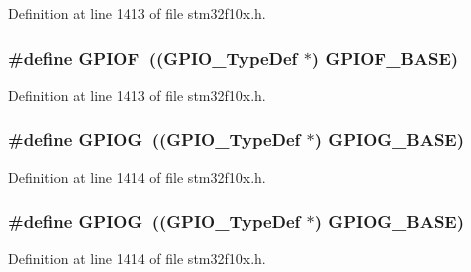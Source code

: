 Definition at line 1413 of file stm32f10x.\+h.

\subsubsection[{\texorpdfstring{G\+P\+I\+OF}{GPIOF}}]{\setlength{\rightskip}{0pt plus 5cm}\#define G\+P\+I\+OF~(({\bf G\+P\+I\+O\+\_\+\+Type\+Def} $\ast$) {\bf G\+P\+I\+O\+F\+\_\+\+B\+A\+SE})}\hypertarget{group___peripheral__declaration_ga43c3022dede7c9db7a58d3c3409dbc8d}{}\label{group___peripheral__declaration_ga43c3022dede7c9db7a58d3c3409dbc8d}


Definition at line 1413 of file stm32f10x.\+h.

\subsubsection[{\texorpdfstring{G\+P\+I\+OG}{GPIOG}}]{\setlength{\rightskip}{0pt plus 5cm}\#define G\+P\+I\+OG~(({\bf G\+P\+I\+O\+\_\+\+Type\+Def} $\ast$) {\bf G\+P\+I\+O\+G\+\_\+\+B\+A\+SE})}\hypertarget{group___peripheral__declaration_ga02a2a23a32f9b02166a8c64012842414}{}\label{group___peripheral__declaration_ga02a2a23a32f9b02166a8c64012842414}


Definition at line 1414 of file stm32f10x.\+h.

\subsubsection[{\texorpdfstring{G\+P\+I\+OG}{GPIOG}}]{\setlength{\rightskip}{0pt plus 5cm}\#define G\+P\+I\+OG~(({\bf G\+P\+I\+O\+\_\+\+Type\+Def} $\ast$) {\bf G\+P\+I\+O\+G\+\_\+\+B\+A\+SE})}\hypertarget{group___peripheral__declaration_ga02a2a23a32f9b02166a8c64012842414}{}\label{group___peripheral__declaration_ga02a2a23a32f9b02166a8c64012842414}


Definition at line 1414 of file stm32f10x.\+h.

